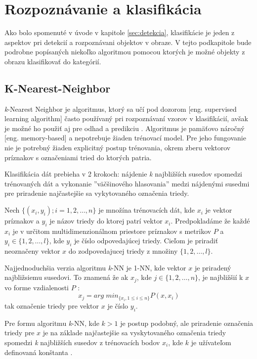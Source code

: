 
\section{Rozpoznávanie a klasifikácia}
\label{sec:klasifikacia}

Ako bolo spomenuté v úvode v kapitole \ref{sec:detekcia}, klasifikácie je jeden z aspektov pri detekcií a rozpoznávani objektov v obraze.
V tejto podkapitole bude podrobne popísaných niekoľko algoritmou pomocou ktorých je možné objekty z obrazu klasifikovať do kategórií.



\subsection{K-Nearest-Neighbor}
\textit{k}-Nearest Neighbor je algoritmus, ktorý sa učí pod dozorom [eng. supervised learning algorithm] často používaný pri rozpoznávaní vzorov v klasifikácií,
avšak je možné ho použiť aj pre odhad a predikciu \cite{book:DataMining}.
Algoritmus je pamäťovo náročný [eng. memory-based] a nepotrebuje žiaden trénovací model.
Pre jeho fungovanie nie je potrebný žiaden explicitný postup trénovania, okrem zberu vektorov príznakov s označeniami tried do ktorých patria.

Klasifikácia dát prebieha v 2 krokoch: nájdenie \textit{k} najbližších susedov spomedzi trénovaných dát a
vykonanie ''väčšinového hlasovania'' medzi nájdenými susedmi pre priradenie najčastejšie sa vykytovaného označenia triedy.

Nech $\{ (x_i, y_i); i = 1, 2, \dots, n \}$ je množína trénovacích dát, kde $x_i$ je vektor príznakov a $y_i$ je názov triedy do ktorej patrí vektor $x_i$.
Predpokladáme že každé $x_i$ je v určitom multidimenzionálnom priestore príznakov s metrikov $P$ a $y_i \in \{ 1, 2, \dots, l \}$, kde $y_i$ je číslo odpovedajúcej triedy.
Cieľom je priradiť neoznačeny vektor $x$ do zodpovedajucej triedy z množiny $\{ 1, 2, \dots, l \}$.

Najjednoduchšia verzia algoritmu \textit{k}-NN je 1-NN, kde vektor $x$ je priradený najbližsiemu susedovi.
To znamená že ak $x_j$, kde $j \in \{ 1, 2, \dots, n \}$, je najbližšií k $x$ vo forme vzdialenosti $P$ \cite{prop:KnnClassification}:
\begin{equation}
    \label{eq:kNNMetric}
    x_j = arg \; min_{\{x_i, 1 \leq i \leq n\}} P(x, x_i)
\end{equation}
tak označenie triedy pre vektor $x$ je číslo $y_i$.

Pre formu algoritmu \textit{k}-NN, kde $k > 1$ je postup podobný, ale priradenie označenia triedy pre $x$ je na základe najčastejšie sa vyskytovaného označenia triedy
spomedzi \textit{k} najbližších susedov z trénovacích bodov $x_i$, kde $k$ je užívateľom definovaná konštanta \cite{prop:KnnClassification}.

